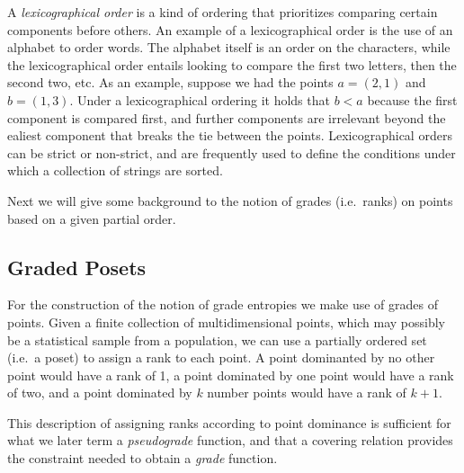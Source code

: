 \documentclass[
  letterpaper,
  DIV=11,
  numbers=noendperiod]{scrreprt}
\begin{document}
A \emph{lexicographical order} is a kind of ordering that prioritizes
comparing certain components before others. An example of a
lexicographical order is the use of an alphabet to order words. The
alphabet itself is an order on the characters, while the lexicographical
order entails looking to compare the first two letters, then the second
two, etc. As an example, suppose we had the points \(a = (2,1)\) and
\(b=(1,3)\). Under a lexicographical ordering it holds that \(b < a\)
because the first component is compared first, and further components
are irrelevant beyond the ealiest component that breaks the tie between
the points. Lexicographical orders can be strict or non-strict, and are
frequently used to define the conditions under which a collection of
strings are sorted.

Next we will give some background to the notion of grades (i.e.~ranks)
on points based on a given partial order.

\subsection{Graded Posets}\label{graded-posets}

For the construction of the notion of grade entropies we make use of
grades of points. Given a finite collection of multidimensional points,
which may possibly be a statistical sample from a population, we can use
a partially ordered set (i.e.~a poset) to assign a rank to each point. A
point dominanted by no other point would have a rank of 1, a point
dominated by one point would have a rank of two, and a point dominated
by \(k\) number points would have a rank of \(k+1\).

\begin{tcolorbox}[enhanced jigsaw, colbacktitle=quarto-callout-note-color!10!white, bottomrule=.15mm, left=2mm, arc=.35mm, bottomtitle=1mm, coltitle=black, breakable, rightrule=.15mm, toptitle=1mm, opacityback=0, titlerule=0mm, title=\textcolor{quarto-callout-note-color}{\faInfo}\hspace{0.5em}{Note}, colframe=quarto-callout-note-color-frame, toprule=.15mm, leftrule=.75mm, opacitybacktitle=0.6, colback=white]

This description of assigning ranks according to point dominance is
sufficient for what we later term a \emph{pseudograde} function, and
that a covering relation provides the constraint needed to obtain a
\emph{grade} function.

\end{tcolorbox}
\end{document}
